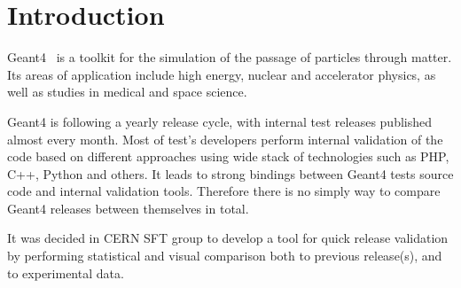 \section{Introduction}
\label{sec-introduction}
Geant4~\cite{Geant4} is a toolkit for the simulation of the passage of particles through matter. Its areas of application include high energy, nuclear and accelerator physics, as well as studies in medical and space science. 

Geant4 is following a yearly release cycle, with internal test releases published almost every month.
Most of test's developers perform internal validation of the code based on different approaches using wide stack of technologies such as PHP, C++, Python and others.
It leads to strong bindings between Geant4 tests source code and internal validation tools.
Therefore there is no simply way to compare Geant4 releases between themselves in total.

It was decided in CERN SFT group to develop a tool for quick release validation by performing statistical and visual comparison both to previous release(s), and to experimental data. 